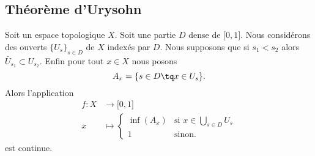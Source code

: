 \subsection{Théorème d'Urysohn}


\begin{lemma}       \label{LEMooWRLRooCdubfZ}
    Soit un espace topologique \( X\). Soit une partie \( D\) dense de \( \mathopen[ 0 , 1 \mathclose]\). Nous considérons des ouverts \( \{ U_s \}_{s\in D} \) de \( X\) indexés par \( D\). Nous supposons que si \( s_1<s_2\) alors \( \bar U_{s_1}\subset U_{s_2}\). Enfin pour tout \( x\in X\) nous posons
    \begin{equation}
        A_x=\{ s\in D\tq x\in U_s \}.
    \end{equation}
    Alors l'application
    \begin{equation}
        \begin{aligned}
            f\colon X&\to \mathopen[ 0 , 1 \mathclose] \\
            x&\mapsto \begin{cases}
                \inf(A_x)    &   \text{si } x\in\bigcup_{s\in D}U_s\\
                1    &    \text{sinon. }
            \end{cases}
        \end{aligned}
    \end{equation}
    est continue.
\end{lemma}


